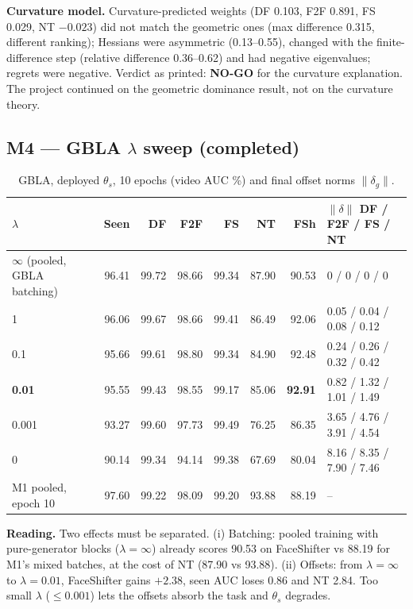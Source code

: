 \documentclass[10pt,a4paper]{article}
\newcommand{\Done}{\textcolor{done}{\textbf{completed}}}
\begin{document}
\textbf{Curvature model.} Curvature-predicted weights (DF 0.103, F2F 0.891, FS 0.029, NT \(-0.023\))
did not match the geometric ones (max difference 0.315, different ranking); Hessians were asymmetric
(0.13--0.55), changed with the finite-difference step (relative difference 0.36--0.62) and had negative
eigenvalues; regrets were negative. Verdict as printed: \textbf{NO-GO} for the curvature explanation.
The project continued on the geometric dominance result, not on the curvature theory.

\subsection{M4 --- GBLA \(\lambda\) sweep (\Done)}
\begin{table}[H]\centering\small
\caption{GBLA, deployed \(\theta_s\), 10 epochs (video AUC \%) and final offset norms \(\|\delta_g\|\).}\label{tab:m4}
\begin{tabularx}{\linewidth}{@{}lRRRRRRL{3.3cm}@{}}
\toprule
\(\lambda\) & Seen & DF & F2F & FS & NT & FSh & \(\|\delta\|\) DF / F2F / FS / NT\\
\midrule
\(\infty\) (pooled, GBLA batching) & 96.41 & 99.72 & 98.66 & 99.34 & 87.90 & 90.53 & 0 / 0 / 0 / 0\\
1 & 96.06 & 99.67 & 98.66 & 99.41 & 86.49 & 92.06 & 0.05 / 0.04 / 0.08 / 0.12\\
0.1 & 95.66 & 99.61 & 98.80 & 99.34 & 84.90 & 92.48 & 0.24 / 0.26 / 0.32 / 0.42\\
\textbf{0.01} & 95.55 & 99.43 & 98.55 & 99.17 & 85.06 & \textbf{92.91} & 0.82 / 1.32 / 1.01 / 1.49\\
0.001 & 93.27 & 99.60 & 97.73 & 99.49 & 76.25 & 86.35 & 3.65 / 4.76 / 3.91 / 4.54\\
0 & 90.14 & 99.34 & 94.14 & 99.38 & 67.69 & 80.04 & 8.16 / 8.35 / 7.90 / 7.46\\
\midrule
M1 pooled, epoch 10 & 97.60 & 99.22 & 98.09 & 99.20 & 93.88 & 88.19 & --\\
\bottomrule
\end{tabularx}
\end{table}
\textbf{Reading.} Two effects must be separated. (i) Batching: pooled training with pure-generator
blocks (\(\lambda=\infty\)) already scores 90.53 on FaceShifter vs 88.19 for M1's mixed batches, at the
cost of NT (87.90 vs 93.88). (ii) Offsets: from \(\lambda=\infty\) to \(\lambda=0.01\), FaceShifter
gains \(+2.38\), seen AUC loses 0.86 and NT 2.84. Too small \(\lambda\) (\(\le0.001\)) lets the offsets
absorb the task and \(\theta_s\) degrades.
\end{document}
